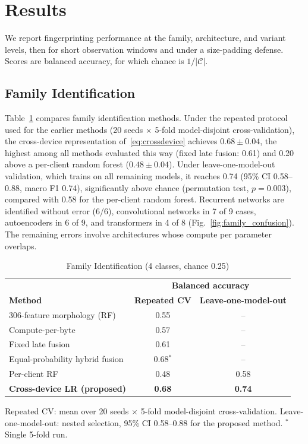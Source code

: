 \section{Results}
\label{sec:results}
We report fingerprinting performance at the family, architecture, and variant
levels, then for short observation windows and under a size-padding defense.
Scores are balanced accuracy, for which chance is $1/|\mathcal{C}|$.

\subsection{Family Identification}
Table~\ref{tab:family_methods} compares family identification methods. Under the
repeated protocol used for the earlier methods (20 seeds $\times$ 5-fold
model-disjoint cross-validation), the cross-device representation
of~\eqref{eq:crossdevice} achieves $0.68 \pm 0.04$, the highest among all
methods evaluated this way (fixed late fusion: 0.61) and 0.20 above a per-client
random forest ($0.48 \pm 0.04$). Under leave-one-model-out validation, which
trains on all remaining models, it reaches 0.74 (95\% CI 0.58--0.88, macro F1
0.74), significantly above chance (permutation test, $p = 0.003$), compared with
0.58 for the per-client random forest. Recurrent networks are identified without
error (6/6), convolutional networks in 7 of 9 cases, autoencoders in 6 of 9, and
transformers in 4 of 8 (Fig.~\ref{fig:family_confusion}). The remaining errors
involve architectures whose compute per parameter overlaps.

\begin{table}[!htbp]
\centering
\caption{Family Identification (4 classes, chance 0.25)}
\label{tab:family_methods}
\scriptsize
\renewcommand{\arraystretch}{1.08}
\setlength{\tabcolsep}{3pt}
\begin{tabular}{lcc}
\hline
 & \multicolumn{2}{c}{\textbf{Balanced accuracy}} \\
\textbf{Method} & \textbf{Repeated CV} & \textbf{Leave-one-model-out} \\
\hline
306-feature morphology (RF)        & 0.55 & -- \\
Compute-per-byte                   & 0.57 & -- \\
Fixed late fusion                  & 0.61 & -- \\
Equal-probability hybrid fusion    & 0.68$^{*}$ & -- \\
Per-client RF                      & 0.48 & 0.58 \\
\textbf{Cross-device LR (proposed)} & \textbf{0.68} & \textbf{0.74} \\
\hline
\end{tabular}

\vspace{2pt}
\parbox{0.95\columnwidth}{\scriptsize Repeated CV: mean over 20 seeds
$\times$ 5-fold model-disjoint cross-validation. Leave-one-model-out: nested
selection, 95\% CI 0.58--0.88 for the proposed method. $^{*}$Single 5-fold run.}
\end{table}

